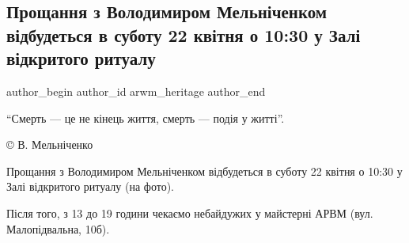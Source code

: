  
 
 
 
 

\subsection{Прощання з Володимиром Мельніченком відбудеться в суботу 22 квітня о 10:30 у Залі відкритого ритуалу}
\label{sec:20_04_2023.fb.arwm_heritage.1.proschannja_volodymyr_melnychenko}

\ifcmt
 author_begin
   author_id arwm_heritage
 author_end
\fi

\enquote{Смерть — це не кінець життя, смерть — подія у житті}.

© В. Мельніченко

Прощання з Володимиром Мельніченком відбудеться в суботу 22 квітня о 10:30 у
Залі відкритого ритуалу (на фото).

Після того, з 13 до 19 години чекаємо небайдужих у майстерні АРВМ (вул.
Малопідвальна, 10б).
